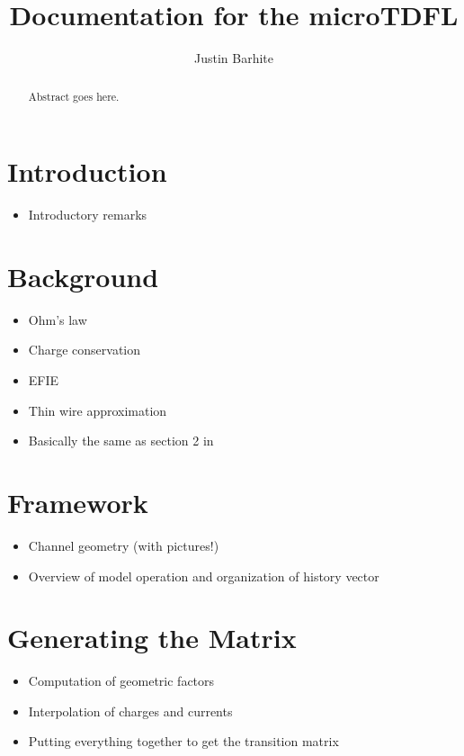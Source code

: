 \documentclass{article}
\title{Documentation for the microTDFL}
\author{Justin Barhite}
\begin{document}
\maketitle

\begin{abstract}
Abstract goes here.
\end{abstract}

\section{Introduction}
\begin{itemize}
\item Introductory remarks
\end{itemize}

\section{Background}
\begin{itemize}
\item Ohm's law
\item Charge conservation
\item EFIE
\item Thin wire approximation
\item Basically the same as section 2 in \cite{mathdev}
\end{itemize}

\section{Framework}
\begin{itemize}
\item Channel geometry (with pictures!)
\item Overview of model operation and organization of history vector
\end{itemize}

\section{Generating the Matrix}
\begin{itemize}
\item Computation of geometric factors
\item Interpolation of charges and currents
\item Putting everything together to get the transition matrix
\end{itemize}
\end{document}
